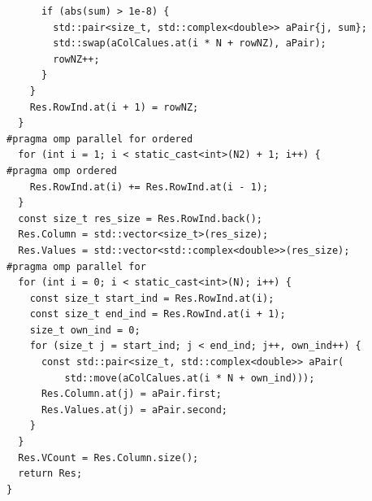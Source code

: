 \documentclass{report}
\begin{document}
\begin{lstlisting}
      if (abs(sum) > 1e-8) {
        std::pair<size_t, std::complex<double>> aPair{j, sum};
        std::swap(aColCalues.at(i * N + rowNZ), aPair);
        rowNZ++;
      }
    }
    Res.RowInd.at(i + 1) = rowNZ;
  }
#pragma omp parallel for ordered
  for (int i = 1; i < static_cast<int>(N2) + 1; i++) {
#pragma omp ordered
    Res.RowInd.at(i) += Res.RowInd.at(i - 1);
  }
  const size_t res_size = Res.RowInd.back();
  Res.Column = std::vector<size_t>(res_size);
  Res.Values = std::vector<std::complex<double>>(res_size);
#pragma omp parallel for
  for (int i = 0; i < static_cast<int>(N); i++) {
    const size_t start_ind = Res.RowInd.at(i);
    const size_t end_ind = Res.RowInd.at(i + 1);
    size_t own_ind = 0;
    for (size_t j = start_ind; j < end_ind; j++, own_ind++) {
      const std::pair<size_t, std::complex<double>> aPair(
          std::move(aColCalues.at(i * N + own_ind)));
      Res.Column.at(j) = aPair.first;
      Res.Values.at(j) = aPair.second;
    }
  }
  Res.VCount = Res.Column.size();
  return Res;
}
\end{lstlisting}

\newpage
\end{document}
